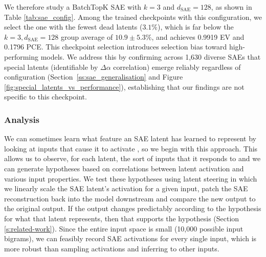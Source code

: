 We therefore study a BatchTopK SAE with $k = 3$ and $d_\text{SAE} = 128$, as shown in Table \ref{tab:sae_config}. Among the trained checkpoints with this configuration, we select the one with the fewest dead latents ($3.1\%$), which is far below the $k=3, d_\text{SAE}=128$ group average of $10.9 \pm 5.3\%$, and achieves 0.9919 EV and 0.1796 PCE. This checkpoint selection introduces selection bias toward high-performing models. We address this by confirming across 1,630 diverse SAEs that special latents (identifiable by $\Delta\alpha$ correlation) emerge reliably regardless of configuration (Section~\ref{ss:sae_generalisation} and Figure \ref{fig:special_latents_vs_performance}), establishing that our findings are not specific to this checkpoint.

\subsubsection{Analysis}

We can sometimes learn what feature an SAE latent has learned to represent by looking at inputs that cause it to activate \cite{bills2023language}, so we begin with this approach. This allows us to observe, for each latent, the sort of inputs that it responds to and we can generate hypotheses based on correlations between latent activation and various input properties. 
We test these hypotheses using latent steering \cite{ferrando2024primer,arditi2024refusal} in which we linearly scale the SAE latent's activation for a given input, patch the SAE reconstruction back into the model downstream and compare the new output to the original output. If the output changes predictably according to the hypothesis for what that latent represents, then that supports the hypothesis (Section \ref{s:related-work}).
Since the entire input space is small (10,000 possible input bigrams), we can feasibly record SAE activations for every single input, which is more robust than sampling activations and inferring to other inputs.

